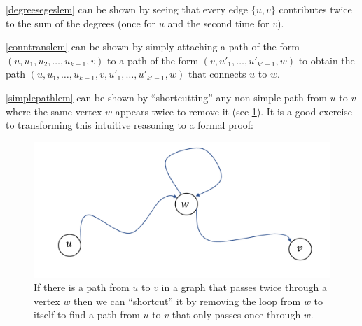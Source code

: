 \cref{degreesegeslem} can be shown by seeing that every edge
\(\{ u,v\}\) contributes twice to the sum of the degrees (once for \(u\)
and the second time for \(v\)).

\hypertarget{conntranslem}{}

\cref{conntranslem} can be shown by simply attaching a path of the form
\((u,u_1,u_2,\ldots,u_{k-1},v)\) to a path of the form
\((v,u'_1,\ldots,u'_{k'-1},w)\) to obtain the path
\((u,u_1,\ldots,u_{k-1},v,u'_1,\ldots,u'_{k'-1},w)\) that connects \(u\)
to \(w\).

\hypertarget{simplepathlem}{}

\cref{simplepathlem} can be shown by ``shortcutting'' any non simple
path from \(u\) to \(v\) where the same vertex \(w\) appears twice to
remove it (see \cref{shortcutpathfig}). It is a good exercise to
transforming this intuitive reasoning to a formal proof:


\begin{figure}
\centering
\includegraphics[width=\textwidth, height=0.25\paperheight, keepaspectratio]{../figure/shortcutpath.png}
\caption{If there is a path from \(u\) to \(v\) in a graph that passes
twice through a vertex \(w\) then we can ``shortcut'' it by removing the
loop from \(w\) to itself to find a path from \(u\) to \(v\) that only
passes once through \(w\).}
\label{shortcutpathfig}
\end{figure}

